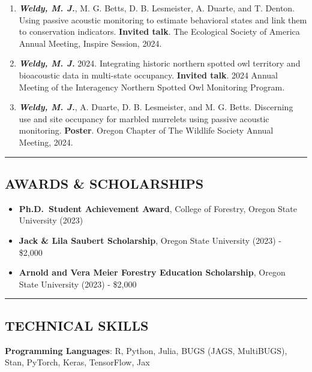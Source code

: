 \documentclass[
  11pt,
  letterpaper,
  DIV=11,
  numbers=noendperiod]{scrartcl}
\providecommand{\tightlist}{%
  \setlength{\itemsep}{0pt}\setlength{\parskip}{0pt}}
\begin{document}
\begin{enumerate}
\def\labelenumi{\arabic{enumi}.}
\item
  \textbf{\emph{Weldy, M. J.}}, M. G. Betts, D. B. Lesmeister, A.
  Duarte, and T. Denton. Using passive acoustic monitoring to estimate
  behavioral states and link them to conservation indicators.
  \textbf{Invited talk}. The Ecological Society of America Annual
  Meeting, Inspire Session, 2024.
\item
  \textbf{\emph{Weldy, M. J.}} 2024. Integrating historic northern
  spotted owl territory and bioacoustic data in multi-state occupancy.
  \textbf{Invited talk}. 2024 Annual Meeting of the Interagency Northern
  Spotted Owl Monitoring Program.
\item
  \textbf{\emph{Weldy, M. J.}}, A. Duarte, D. B. Lesmeister, and M. G.
  Betts. Discerning use and site occupancy for marbled murrelets using
  passive acoustic monitoring. \textbf{Poster}. Oregon Chapter of The
  Wildlife Society Annual Meeting, 2024.
\end{enumerate}

\begin{center}\rule{0.5\linewidth}{0.5pt}\end{center}

\subsection{AWARDS \& SCHOLARSHIPS}\label{awards-scholarships}

\begin{itemize}
\tightlist
\item
  \textbf{Ph.D.~Student Achievement Award}, College of Forestry, Oregon
  State University (2023)
\item
  \textbf{Jack \& Lila Saubert Scholarship}, Oregon State University
  (2023) - \$2,000
\item
  \textbf{Arnold and Vera Meier Forestry Education Scholarship}, Oregon
  State University (2023) - \$2,000
\end{itemize}

\begin{center}\rule{0.5\linewidth}{0.5pt}\end{center}

\subsection{TECHNICAL SKILLS}\label{technical-skills}

\textbf{Programming Languages}: R, Python, Julia, BUGS (JAGS,
MultiBUGS), Stan, PyTorch, Keras, TensorFlow, Jax
\end{document}
